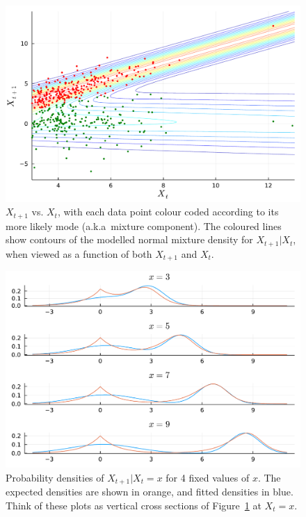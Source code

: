 \documentclass[11pt,twoside,openany]{book}
\numberwithin{Theorem}{chapter}
\numberwithin{Definition}{chapter}
\numberwithin{Lemma}{chapter}
\numberwithin{Algorithm}{chapter}
\numberwithin{equation}{chapter}
\begin{document}
\begin{figure}[htp]
  \centering
  \includegraphics[scale=0.7]{../ht-em/figures/worked_example_contour_fit.pdf}
  \caption{$X_{t+1}$ vs. $X_t$, with each data point colour coded according to
    its more likely mode (a.k.a\ mixture component). The coloured
    lines show contours of the modelled normal mixture density
    for $X_{t+1}|X_{t}$, when viewed as a function of both $X_{t+1}$ and $X_{t}$.
}\label{fig:worked_example_contour_1}
\end{figure}


\begin{figure}[htp]
  \centering
  \includegraphics[scale=0.7]{../ht-em/figures/worked_example_vs_true.pdf}
  \caption{Probability densities of $X_{t+1}|X_{t}=x$ for 4 fixed values of $x$.
    The expected densities are shown in orange, and fitted densities in blue.
    Think of these plots as vertical cross sections of Figure~\ref{fig:worked_example_contour_1} at
    $X_t=x$.
   }\label{fig:worked_example_vs_true_1}
\end{figure}
\end{document}
